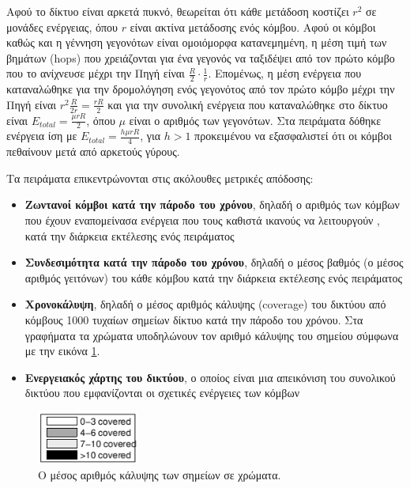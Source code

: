 Αφού το δίκτυο είναι αρκετά πυκνό, θεωρείται ότι κάθε μετάδοση κοστίζει $r^{2}$ σε μονάδες ενέργειας, όπου $r$ είναι ακτίνα μετάδοσης ενός κόμβου. Αφού οι κόμβοι
καθώς και η γέννηση γεγονότων είναι ομοιόμορφα κατανεμημένη, η μέση τιμή των βημάτων (hops) που χρειάζονται για ένα γεγονός να ταξιδέψει από τον πρώτο κόμβο που το
ανίχνευσε μέχρι την Πηγή είναι $\frac{R}{2}\cdot \frac{1}{r}$. Επομένως, η μέση ενέργεια που καταναλώθηκε για την δρομολόγηση ενός γεγονότος από τον πρώτο κόμβο μέχρι
την Πηγή είναι $r^2\frac{R}{2r} = \frac{rR}{2}$ και για την συνολική ενέργεια που καταναλώθηκε στο δίκτυο είναι $E_{total} = \frac{\mu r R}{2}$, όπου $\mu$ είναι ο
αριθμός των γεγονότων. Στα πειράματα δόθηκε ενέργεια ίση με $E_{total} = \frac{h\mu r R}{4}$, για $h > 1$ προκειμένου να εξασφαλιστεί ότι οι κόμβοι πεθαίνουν μετά
από αρκετούς γύρους.

Τα πειράματα επικεντρώνονται στις ακόλουθες μετρικές απόδοσης:
\begin{itemize}
\item \textbf{Ζωντανοί κόμβοι κατά την πάροδο του χρόνου}, δηλαδή ο αριθμός των κόμβων που έχουν εναπομείνασα ενέργεια που τους καθιστά ικανούς να λειτουργούν , κατά
την διάρκεια εκτέλεσης ενός πειράματος
\item \textbf{Συνδεσιμότητα κατά την πάροδο του χρόνου}, δηλαδή ο μέσος βαθμός (ο μέσος αριθμός γειτόνων) του κάθε κόμβου κατά την διάρκεια εκτέλεσης ενός πειράματος
\item \textbf{Χρονοκάλυψη}, δηλαδή ο μέσος αριθμός κάλυψης (coverage) του δικτύου από κόμβους 1000 τυχαίων σημείων δίκτυο κατά την πάροδο του χρόνου. Στα γραφήματα τα
χρώματα υποδηλώνουν τον αριθμό κάλυψης του σημείου σύμφωνα με την εικόνα \ref{fig:coverage_sample}.
\item \textbf{Ενεργειακός χάρτης του δικτύου}, ο οποίος είναι μια απεικόνιση του συνολικού δικτύου που εμφανίζονται οι σχετικές ενέργειες των κόμβων
\end{itemize}

\begin{figure}[h]
  \centering
  \includegraphics[width=0.3\textwidth]{images/network_coverage.eps}
  \caption{Ο μέσος αριθμός κάλυψης των σημείων σε χρώματα.}
  \label{fig:coverage_sample}
\end{figure}

